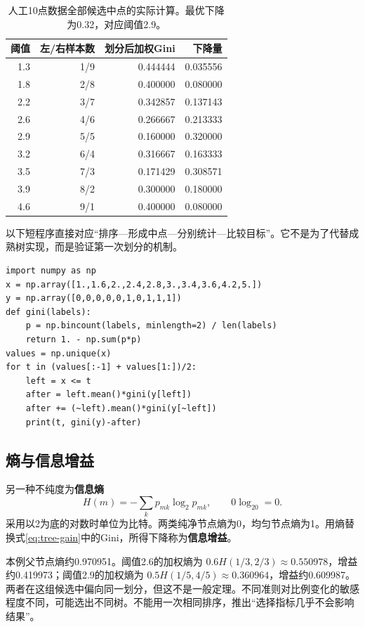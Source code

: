 \begin{table}[htbp]\centering\small
\caption{人工10点数据全部候选中点的实际计算。最优下降为0.32，对应阈值2.9。}
\begin{tabular}{rrrr}\toprule
阈值&左/右样本数&划分后加权Gini&下降量\\\midrule
1.3&1/9&0.444444&0.035556\\
1.8&2/8&0.400000&0.080000\\
2.2&3/7&0.342857&0.137143\\
2.6&4/6&0.266667&0.213333\\
2.9&5/5&0.160000&0.320000\\
3.2&6/4&0.316667&0.163333\\
3.5&7/3&0.171429&0.308571\\
3.9&8/2&0.300000&0.180000\\
4.6&9/1&0.400000&0.080000\\\bottomrule
\end{tabular}\end{table}


以下短程序直接对应“排序—形成中点—分别统计—比较目标”。它不是为了代替成熟树实现，而是验证第一次划分的机制。
\begin{lstlisting}[caption={枚举一个数值特征的候选阈值}]
import numpy as np
x = np.array([1.,1.6,2.,2.4,2.8,3.,3.4,3.6,4.2,5.])
y = np.array([0,0,0,0,0,1,0,1,1,1])
def gini(labels):
    p = np.bincount(labels, minlength=2) / len(labels)
    return 1. - np.sum(p*p)
values = np.unique(x)
for t in (values[:-1] + values[1:])/2:
    left = x <= t
    after = left.mean()*gini(y[left])
    after += (~left).mean()*gini(y[~left])
    print(t, gini(y)-after)
\end{lstlisting}

\subsection{熵与信息增益}
另一种不纯度为\textbf{信息熵}
\[
H(m)=-\sum_kp_{mk}\log_2p_{mk},\qquad 0\log_20=0.
\]
采用以2为底的对数时单位为比特。两类纯净节点熵为0，均匀节点熵为1。用熵替换式\eqref{eq:tree-gain}中的Gini，所得下降称为\textbf{信息增益}。

本例父节点熵约0.970951。阈值2.6的加权熵为 $0.6H(1/3,2/3)\approx0.550978$，增益约0.419973；阈值2.9的加权熵为 $0.5H(1/5,4/5)\approx0.360964$，增益约0.609987。两者在这组候选中偏向同一划分，但这不是一般定理。不同准则对比例变化的敏感程度不同，可能选出不同树。不能用一次相同排序，推出“选择指标几乎不会影响结果”。


